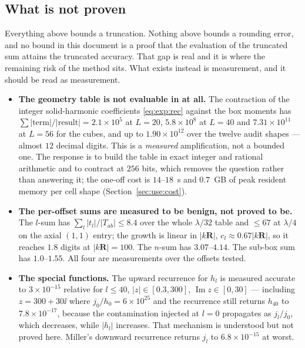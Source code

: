 
\subsection{What is not proven}
\label{sec:bnd:notproven}

Everything above bounds a truncation. Nothing above bounds a rounding error, and no
bound in this document is a proof that the  evaluation of the truncated sum
attains the truncated accuracy. That gap is real and it is where the remaining risk of the
method sits. What exists instead is measurement, and it should be read as measurement.

\begin{itemize}[nosep,leftmargin=1.4em]
\item \textbf{The geometry table is not evaluable in  at all.} The
contraction of the integer solid-harmonic coefficients \eqref{eq:exp:rec} against the box
moments has $\sum|\text{term}|/|\text{result}| = 2.1\times10^{5}$ at $L = 20$,
$5.8\times10^{8}$ at $L = 40$ and $7.31\times10^{11}$ at $L = 56$ for the cubes, and up to
$1.90\times10^{12}$ over the twelve audit shapes --- almost $12$ decimal digits. This is a
\emph{measured} amplification, not a bounded one. The response is to build the table in
exact integer and rational arithmetic and to contract at $256$ bits, which removes the
question rather than answering it; the one-off cost is $14$--$18$~s and $0.7$~GB of
peak resident memory per cell shape (Section~\ref{sec:use:cost}).
\item \textbf{The per-offset sums are measured to be benign, not proved to be.} The
$l$-sum has $\sum_l|t_l|/|T_{ab}| \le 8.4$ over the whole $\lambda/32$ table and
$\le 67$ at $\lambda/4$ on the axial $(1,1)$ entry; the growth is linear in
$|k\mathbf{R}|$, $c_l \approx 0.67|k\mathbf{R}|$, so it reaches $1.8$ digits at
$|k\mathbf{R}| = 100$. The $n$-sum has $3.07$--$4.14$. The sub-box sum has $1.0$--$1.55$.
All four are measurements over the offsets tested.
\item \textbf{The special functions.} The upward recurrence for $h_l$ is measured
accurate to $3\times10^{-15}$ relative for $l \le 40$,
$|z| \in [0.3,300]$, $\operatorname{Im}z \in [0,30]$ --- including
$z = 300+30\ii$ where $j_0/h_0 = 6\times10^{25}$ and the recurrence still returns $h_{40}$
to $7.8\times10^{-17}$, because the contamination injected at $l = 0$ propagates as
$j_l/j_0$, which decreases, while $|h_l|$ increases. That mechanism is understood but not
proved here. Miller's downward recurrence returns $j_l$ to $6.8\times10^{-15}$ at worst.

\end{itemize}
